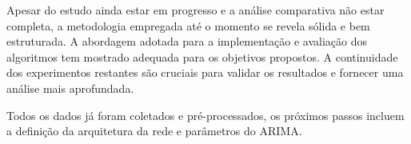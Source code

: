 Apesar do estudo ainda estar em progresso e a análise comparativa não estar completa, 
a metodologia empregada até o momento se revela sólida e bem estruturada. A abordagem adotada para a implementação e avaliação dos algoritmos tem mostrado adequada para os objetivos propostos. A continuidade dos experimentos restantes são cruciais para validar os resultados e fornecer uma análise mais aprofundada.

Todos os dados já foram coletados e pré-processados, os próximos passos incluem a definição da arquitetura da rede e parâmetros do ARIMA.